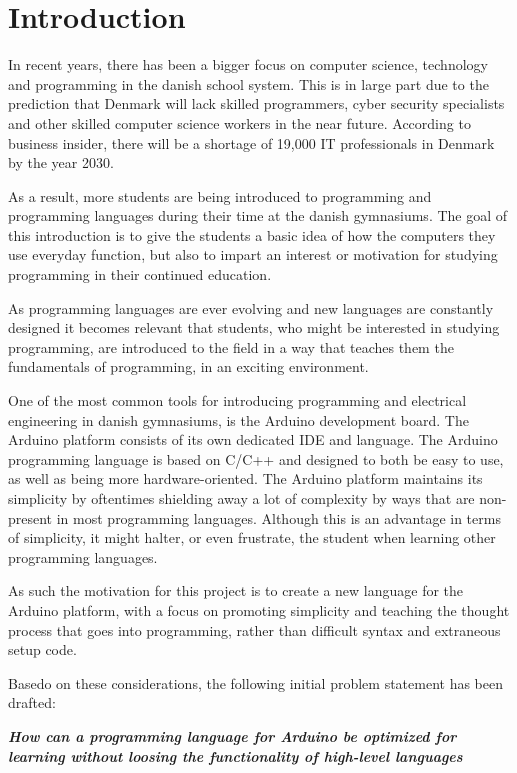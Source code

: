 
\chapter{Introduction}
In recent years, there has been a bigger focus on computer science, technology and programming in the danish school system.
This is in large part due to the prediction that Denmark will lack skilled programmers, cyber security specialists and other skilled computer science workers in the near future.
According to business insider, there will be a shortage of 19,000 IT professionals in Denmark by the year 2030.\cite{ITLackDK}

As a result, more students are being introduced to programming and programming languages during their time at the
danish gymnasiums. 
The goal of this introduction is to give the students a basic idea of how the computers they use everyday function, but also to impart an interest or motivation for studying programming in their continued education.

As programming languages are ever evolving and new languages are constantly designed it becomes relevant
that students, who might be interested in studying programming, are introduced to the field in a way that
teaches them the fundamentals of programming, in an exciting environment.

One of the most common tools for introducing programming and electrical engineering in danish gymnasiums, is
the Arduino development board. The Arduino platform consists of its own dedicated IDE and language.
The Arduino programming language is based on C/C++ and designed to both be easy to use, as well as being
more hardware-oriented.\cite{ArFAQ}
The Arduino platform maintains its simplicity by oftentimes shielding away a lot of complexity by ways
that are non-present in most programming languages.
Although this is an advantage in terms of simplicity, it might halter, or even frustrate, the student when learning other programming languages.

As such the motivation for this project is to create a new language for the Arduino platform, with a focus on promoting simplicity and teaching the thought process that goes into programming, rather than difficult syntax and extraneous setup code.


Basedo on these considerations, the following initial problem statement has been drafted:

\begin{center}
	\textit{\textbf{How can a programming language for Arduino be optimized for learning without 
			loosing the functionality of high-level languages}}
\end{center}
